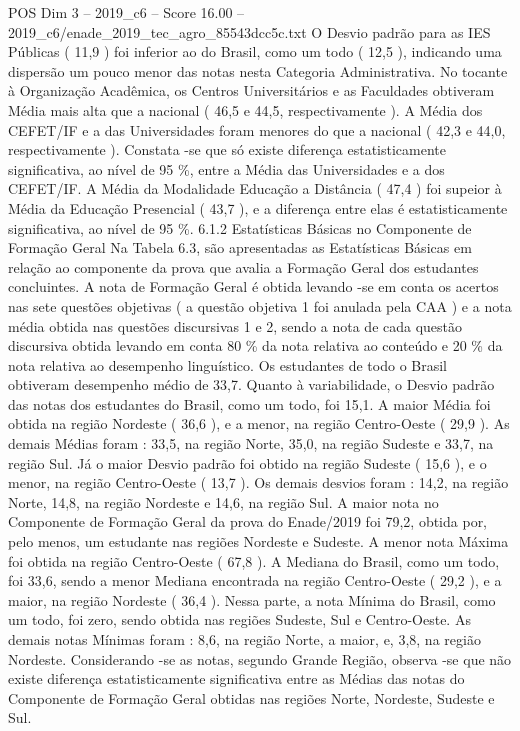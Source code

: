 \begin{textsample}{POS Dim 3 – 2019\_c6 – Score 16.00 – 2019\_c6/enade\_2019\_tec\_agro\_85543dcc5c.txt}
O Desvio padrão para as IES Públicas ( 11,9 ) foi inferior ao do Brasil, como um todo ( 12,5 ), indicando uma dispersão um pouco menor das notas nesta Categoria Administrativa.
No tocante à Organização Acadêmica, os Centros Universitários e as Faculdades obtiveram Média mais alta que a nacional ( 46,5 e 44,5, respectivamente ).
A Média dos CEFET/IF e a das Universidades foram menores do que a nacional ( 42,3 e 44,0, respectivamente ).
Constata -se que só existe diferença estatisticamente significativa, ao nível de 95 \%, entre a Média das Universidades e a dos CEFET/IF.
A Média da Modalidade Educação a Distância ( 47,4 ) foi supeior à Média da Educação Presencial ( 43,7 ), e a diferença entre elas é estatisticamente significativa, ao nível de 95 \%. 6.1.2 Estatísticas Básicas no Componente de Formação Geral Na Tabela 6.3, são apresentadas as Estatísticas Básicas em relação ao componente da prova que avalia a Formação Geral dos estudantes concluintes.
A nota de Formação Geral é obtida levando -se em conta os acertos nas sete questões objetivas ( a questão objetiva 1 foi anulada pela CAA ) e a nota média obtida nas questões discursivas 1 e 2, sendo a nota de cada questão discursiva obtida levando em conta 80 \% da nota relativa ao conteúdo e 20 \% da nota relativa ao desempenho linguístico.
Os estudantes de todo o Brasil obtiveram desempenho médio de 33,7.
Quanto à variabilidade, o Desvio padrão das notas dos estudantes do Brasil, como um todo, foi 15,1.
A maior Média foi obtida na região Nordeste ( 36,6 ), e a menor, na região Centro-Oeste ( 29,9 ).
As demais Médias foram : 33,5, na região Norte, 35,0, na região Sudeste e 33,7, na região Sul.
Já o maior Desvio padrão foi obtido na região Sudeste ( 15,6 ), e o menor, na região Centro-Oeste ( 13,7 ).
Os demais desvios foram : 14,2, na região Norte, 14,8, na região Nordeste e 14,6, na região Sul.
A maior nota no Componente de Formação Geral da prova do Enade/2019 foi 79,2, obtida por, pelo menos, um estudante nas regiões Nordeste e Sudeste.
A menor nota Máxima foi obtida na região Centro-Oeste ( 67,8 ).
A Mediana do Brasil, como um todo, foi 33,6, sendo a menor Mediana encontrada na região Centro-Oeste ( 29,2 ), e a maior, na região Nordeste ( 36,4 ).
Nessa parte, a nota Mínima do Brasil, como um todo, foi zero, sendo obtida nas regiões Sudeste, Sul e Centro-Oeste.
As demais notas Mínimas foram : 8,6, na região Norte, a maior, e, 3,8, na região Nordeste.
Considerando -se as notas, segundo Grande Região, observa -se que não existe diferença estatisticamente significativa entre as Médias das notas do Componente de Formação Geral obtidas nas regiões Norte, Nordeste, Sudeste e Sul.

\end{textsample}
